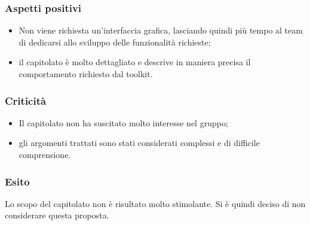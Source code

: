 \subsubsection{Aspetti positivi}
	\begin{itemize}
		\item Non viene richiesta un'interfaccia grafica, lasciando quindi più tempo al team di dedicarsi allo sviluppo delle funzionalità richieste; 
		\item il capitolato è molto dettagliato e descrive in maniera precisa il comportamento richiesto dal toolkit.
	\end{itemize}

\subsubsection{Criticità}
\begin{itemize}
	\item Il capitolato non ha suscitato molto interesse nel gruppo; 
	\item gli argomenti trattati sono stati considerati complessi e di difficile comprensione. 
\end{itemize}

\subsubsection{Esito}
Lo scopo del capitolato non è risultato molto stimolante. Si è quindi deciso di non considerare questa proposta. 
